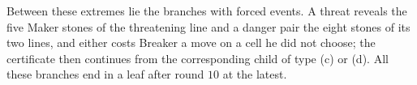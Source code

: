 Between these extremes lie the branches with forced events. A threat reveals the five Maker stones of the
threatening line and a danger pair the eight stones of its two lines, and either costs Breaker a move on a
cell he did not choose; the certificate then continues from the corresponding child of type (c) or (d).
All these branches end in a leaf after round $10$ at the latest.
